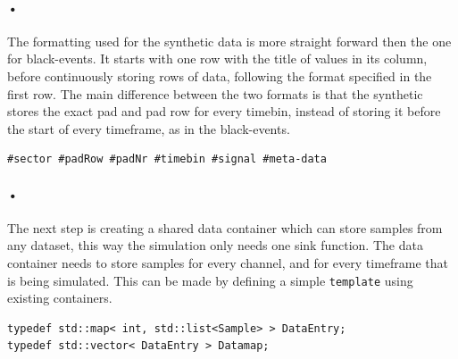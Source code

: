 \documentclass[a4paper, 12pt]{report}
\newcommand{\codeword}[1]{\texttt{#1}}
\begin{document}
\paragraph{•}
The formatting used for the synthetic data is more straight forward then the one for black-events.
It starts with one row with the title of values in its column, before continuously storing rows of data, following the format specified in the first row.
The main difference between the two formats is that the synthetic stores the exact pad and pad row for every timebin, instead of storing it before the start of every timeframe, as in the black-events.

\begin{lstlisting}[caption=Format for the synthetic dataset., label=lst:synthetic-data-format]
#sector #padRow #padNr #timebin #signal #meta-data
\end{lstlisting}

\paragraph{•}
The next step is creating a shared data container which can store samples from any dataset, this way the simulation only needs one sink function.
The data container needs to store samples for every channel, and for every timeframe that is being simulated.
This can be made by defining a simple \codeword{template} using existing containers.

\begin{lstlisting}[caption=Data container., label=lst:data-template]
typedef std::map< int, std::list<Sample> > DataEntry;
typedef std::vector< DataEntry > Datamap;
\end{lstlisting}
\end{document}
